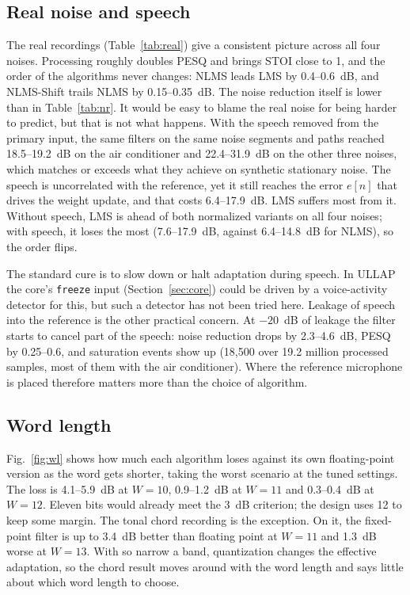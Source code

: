 \subsection{Real noise and speech}
\begin{\WT}[!htbp]\centering\small
\caption{Real recorded noise and speech (MS-SNSD), fixed point $W=12$, mean $\pm$ 95\% CI over 20 seeds, no
speech leakage into the reference; STOI and PESQ of $e$ against $s$, with the unprocessed input in brackets.}\label{tab:real}
\fitwide{}
\end{\WT}
The real recordings (Table~\ref{tab:real}) give a consistent picture across all four noises. Processing
roughly doubles PESQ and brings STOI close to 1, and the order of the algorithms never changes: NLMS leads
LMS by 0.4--0.6~dB, and NLMS-Shift trails NLMS by 0.15--0.35~dB. The noise reduction itself is lower than
in Table~\ref{tab:nr}. It would be easy to blame the real noise for being harder to predict, but that is
not what happens. With the speech removed from the primary input, the same filters on the same noise
segments and paths reached 18.5--19.2~dB on the air conditioner and 22.4--31.9~dB on the other three
noises, which matches or exceeds what they achieve on synthetic stationary noise.
The speech is uncorrelated with the reference, yet it still reaches the error $e[n]$ that drives the
weight update, and that costs 6.4--17.9~dB. LMS suffers most from it. Without speech, LMS is ahead of both
normalized variants on all four noises; with speech, it loses the most (7.6--17.9~dB, against
6.4--14.8~dB for NLMS), so the order flips.

The standard cure is to slow down or halt adaptation during speech. In ULLAP the core's \texttt{freeze}
input (Section~\ref{sec:core}) could be driven by a voice-activity detector for this, but such a detector
has not been tried here. Leakage of speech into the reference is the other practical concern. At
$-20$~dB of leakage the filter starts to cancel part of the speech: noise reduction drops by
2.3--4.6~dB, PESQ by 0.25--0.6, and saturation events show up (18,500 over 19.2 million processed
samples, most of them with the air conditioner). Where the reference microphone is placed therefore
matters more than the choice of algorithm.

\subsection{Word length}
Fig.~\ref{fig:wl} shows how much each algorithm loses against its own floating-point version as the word
gets shorter, taking the worst scenario at the tuned settings. The loss is 4.1--5.9~dB at $W=10$,
0.9--1.2~dB at $W=11$ and 0.3--0.4~dB at $W=12$. Eleven bits would already meet the 3~dB criterion; the
design uses 12 to keep some margin. The tonal chord recording is the exception. On it, the fixed-point
filter is up to 3.4~dB better than floating point at $W=11$ and 1.3~dB worse at $W=13$. With so narrow a
band, quantization changes the effective adaptation, so the chord result moves around with the word
length and says little about which word length to choose.

